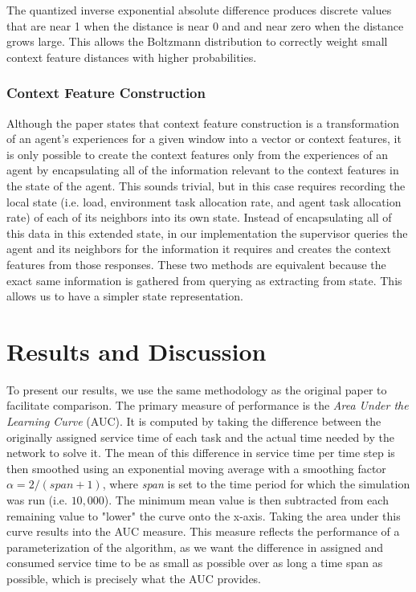 \documentclass[letterpaper]{article}
\begin{document}
The quantized inverse exponential absolute difference produces discrete values that are near 1 when the distance is near 0 and and near zero when the distance grows large. This allows the Boltzmann distribution to correctly weight small context feature distances with higher probabilities.

\subsubsection{Context Feature Construction}
Although the paper states that context feature construction is a transformation of an agent’s experiences for a given window into a vector or context features, it is only possible to create the context features only from the experiences of an agent by encapsulating all of the information relevant to the context features in the state of the agent. This sounds trivial, but in this case requires recording the local state (i.e. load, environment task allocation rate, and agent task allocation rate) of each of its neighbors into its own state. Instead of encapsulating all of this data in this extended state, in our implementation the supervisor queries the agent and its neighbors for the information it requires and creates the context features from those responses.  These two methods are equivalent because the exact same information is gathered from querying as extracting from state. This allows us to have a simpler state representation.

\section{Results and Discussion}
To present our results, we use the same methodology as the original paper to facilitate comparison. The primary measure of performance is the \textit{Area Under the Learning Curve} (AUC). It is computed by taking the difference between the originally assigned service time of each task and the actual time needed by the network to solve it. The mean of this difference in service time per time step is then smoothed using an exponential moving average with a smoothing factor $\alpha=2/(span+1)$, where \textit{span} is set to the time period for which the simulation was run (i.e. $10,000$). The minimum mean value is then subtracted from each remaining value to "lower" the curve onto the x-axis. Taking the area under this curve results into the AUC measure. This measure reflects the performance of a parameterization of the algorithm, as we want the difference in assigned and consumed service time to be as small as possible over as long a time span as possible, which is precisely what the AUC provides.
\end{document}
